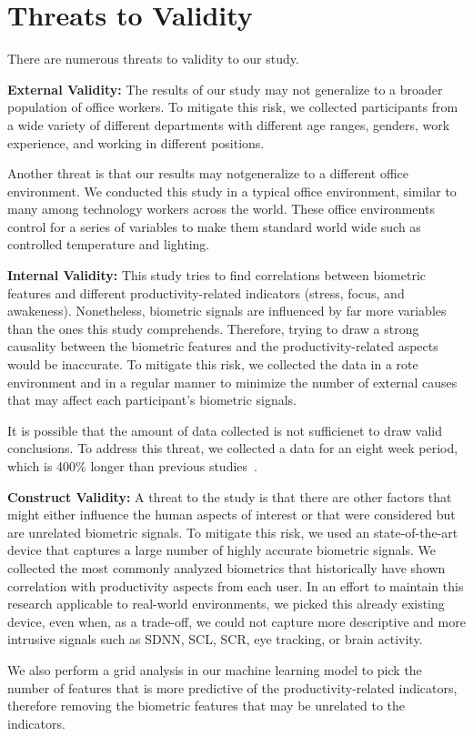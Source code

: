 \section{Threats to Validity}
There are numerous threats to validity to our study.

\textbf{External Validity:}
The results of our study may 
 not generalize to a broader population of office workers.
To mitigate this risk, we collected participants
from a wide variety of different departments
with different age ranges, genders, work experience, and 
working in different positions.

Another threat is that our results may notgeneralize
to a different office environment. We  conducted
this study in a typical office environment,  similar to many
among technology workers across the world.
These office environments control for a series of
variables to make them standard world wide such
as controlled temperature and lighting.

\textbf{Internal Validity:}
This study tries to find correlations between
biometric features and different productivity-related indicators (stress, focus, and awakeness).
Nonetheless, biometric signals are influenced by far more
variables than the ones this study comprehends.
Therefore, trying to draw a strong causality between the biometric
features and the productivity-related aspects would be inaccurate.
To mitigate this risk,  we collected the data
in a rote environment and in a regular manner 
to minimize the number of 
external causes that may affect each participant's
biometric signals.

It is possible that the amount of data collected
is not sufficienet
to draw valid conclusions. To address this threat, 
we collected a data for an eight week period, which is
400\% longer than previous studies~\cite{zuger18,Muller16}.


\textbf{Construct Validity:}
A threat to the study is that
there are other factors that might either influence the
human aspects of interest or that were considered but
are unrelated biometric signals.
To mitigate this risk, we used an state-of-the-art
device that captures a large number of highly accurate biometric
signals. We collected the most commonly analyzed
biometrics that historically have shown correlation with 
productivity aspects from each user.
In an effort to maintain this research applicable to real-world environments, we picked this already existing device, even when, as a trade-off, we could not capture more descriptive and more intrusive signals such as SDNN, SCL, SCR, eye tracking, or brain activity.

We also perform a grid analysis in our machine learning model
to pick the number of features that is more predictive
of the productivity-related indicators, 
therefore removing the biometric
features that may be unrelated to the indicators.











